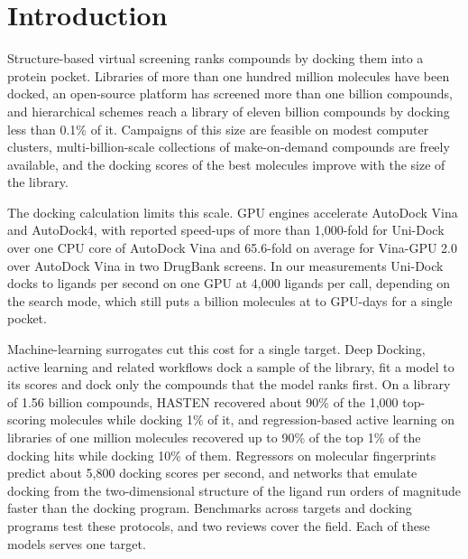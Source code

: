 \section{Introduction}

Structure-based virtual screening ranks compounds by docking them into a protein pocket. Libraries of more than one hundred million molecules have been docked,\cite{lyu2019} an open-source platform has screened more than one billion compounds,\cite{gorgulla2020} and hierarchical schemes reach a library of eleven billion compounds by docking less than 0.1\% of it.\cite{sadybekov2022} Campaigns of this size are feasible on modest computer clusters,\cite{bender2021} multi-billion-scale collections of make-on-demand compounds are freely available,\cite{tingle2023} and the docking scores of the best molecules improve with the size of the library.\cite{lyu2023}

The docking calculation limits this scale. GPU engines accelerate AutoDock Vina\cite{vina,vina12} and AutoDock4,\cite{santosmartins2021} with reported speed-ups of more than 1{,}000-fold for Uni-Dock over one CPU core of AutoDock Vina\cite{unidock} and 65.6-fold on average for Vina-GPU 2.0 over AutoDock Vina in two DrugBank screens.\cite{vinagpu} In our measurements Uni-Dock docks \dockRate{} to \dockRateFastest{} ligands per second on one GPU at 4{,}000 ligands per call, depending on the search mode, which still puts a billion molecules at \dockBillionDaysFast{} to \dockBillionDays{} GPU-days for a single pocket.

Machine-learning surrogates cut this cost for a single target. Deep Docking, active learning and related workflows dock a sample of the library, fit a model to its scores and dock only the compounds that the model ranks first.\cite{deepdocking,gentile2022,molpal,yang2021,carlsson2025} On a library of 1.56 billion compounds, HASTEN recovered about 90\% of the 1{,}000 top-scoring molecules while docking 1\% of it,\cite{sivula2023} and regression-based active learning on libraries of one million molecules recovered up to 90\% of the top 1\% of the docking hits while docking 10\% of them.\cite{marin2024} Regressors on molecular fingerprints predict about 5{,}800 docking scores per second,\cite{berenger2021} and networks that emulate docking from the two-dimensional structure of the ligand run orders of magnitude faster than the docking program.\cite{jastrzebski2020} Benchmarks across targets and docking programs test these protocols,\cite{difilippo2025} and two reviews cover the field.\cite{sadybekov2023,cavasotto2023} Each of these models serves one target.

